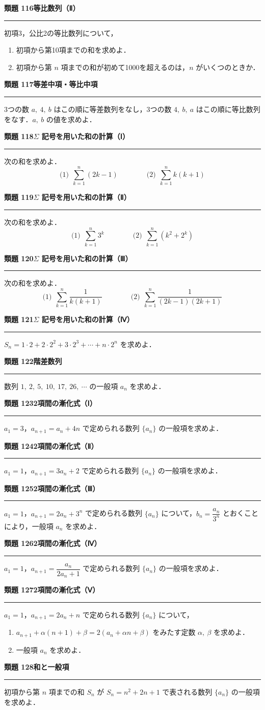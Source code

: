 \documentclass[a4paper,11pt]{ltjsarticle}
\newcommand{\mon}[2]{\Needspace{7\baselineskip}\vspace{10pt}%
  {\sffamily\bfseries 類題 #1\quad #2\par}\vspace{2pt}\hrule\vspace{4pt}}
\begin{document}
\mon{116}{等比数列（Ⅱ）}
初項3，公比2の等比数列について，
\begin{enumerate}
\item 初項から第10項までの和を求めよ．
\item 初項から第 $n$ 項までの和が初めて1000を超えるのは，$n$ がいくつのときか．
\end{enumerate}

\mon{117}{等差中項・等比中項}
3つの数 $a,\ 4,\ b$ はこの順に等差数列をなし，3つの数 $4,\ b,\ a$ はこの順に等比数列をなす．$a,\ b$ の値を求めよ．

\mon{118}{$\Sigma$ 記号を用いた和の計算（Ⅰ）}
次の和を求めよ．
\[\text{(1)}\ \ \sum_{k=1}^n(2k-1)\qquad\qquad\text{(2)}\ \ \sum_{k=1}^nk(k+1)\]

\mon{119}{$\Sigma$ 記号を用いた和の計算（Ⅱ）}
次の和を求めよ．
\[\text{(1)}\ \ \sum_{k=1}^n3^k\qquad\qquad\text{(2)}\ \ \sum_{k=1}^n(k^2+2^k)\]

\mon{120}{$\Sigma$ 記号を用いた和の計算（Ⅲ）}
次の和を求めよ．
\[\text{(1)}\ \ \sum_{k=1}^n\frac1{k(k+1)}\qquad\qquad\text{(2)}\ \ \sum_{k=1}^n\frac1{(2k-1)(2k+1)}\]

\mon{121}{$\Sigma$ 記号を用いた和の計算（Ⅳ）}
$S_n=1\cdot2+2\cdot2^2+3\cdot2^3+\cdots+n\cdot2^n$ を求めよ．

\mon{122}{階差数列}
数列 $1,\ 2,\ 5,\ 10,\ 17,\ 26,\ \cdots$ の一般項 $a_n$ を求めよ．

\mon{123}{2項間の漸化式（Ⅰ）}
$a_1=3$，$a_{n+1}=a_n+4n$ で定められる数列 $\{a_n\}$ の一般項を求めよ．

\mon{124}{2項間の漸化式（Ⅱ）}
$a_1=1$，$a_{n+1}=3a_n+2$ で定められる数列 $\{a_n\}$ の一般項を求めよ．

\mon{125}{2項間の漸化式（Ⅲ）}
$a_1=1$，$a_{n+1}=2a_n+3^n$ で定められる数列 $\{a_n\}$ について，$b_n=\dfrac{a_n}{3^n}$ とおくことにより，一般項 $a_n$ を求めよ．

\mon{126}{2項間の漸化式（Ⅳ）}
$a_1=1$，$a_{n+1}=\dfrac{a_n}{2a_n+1}$ で定められる数列 $\{a_n\}$ の一般項を求めよ．

\mon{127}{2項間の漸化式（Ⅴ）}
$a_1=1$，$a_{n+1}=2a_n+n$ で定められる数列 $\{a_n\}$ について，
\begin{enumerate}
\item $a_{n+1}+\alpha(n+1)+\beta=2(a_n+\alpha n+\beta)$ をみたす定数 $\alpha,\ \beta$ を求めよ．
\item 一般項 $a_n$ を求めよ．
\end{enumerate}

\mon{128}{和と一般項}
初項から第 $n$ 項までの和 $S_n$ が $S_n=n^2+2n+1$ で表される数列 $\{a_n\}$ の一般項を求めよ．
\end{document}
